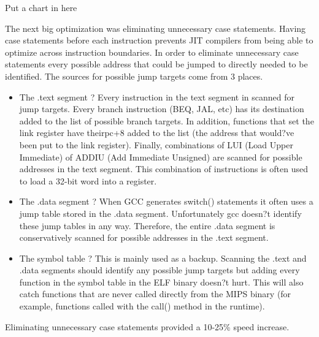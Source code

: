 \documentclass{acmconf}
\begin{document}
Put a chart in here

The next big optimization was eliminating unnecessary case
statements. Having case statements before each instruction prevents
JIT compilers from being able to optimize across instruction
boundaries. In order to eliminate unnecessary case statements every
possible address that could be jumped to directly needed to be
identified. The sources for possible jump targets come from 3 places.

\begin{itemize}

\item The .text segment ? Every instruction in the text segment in
      scanned for jump targets. Every branch instruction (BEQ, JAL,
      etc) has its destination added to the list of possible branch
      targets. In addition, functions that set the link register have
      theirpc+8 added to the list (the address that would?ve been put
      to the link register). Finally, combinations of LUI (Load Upper
      Immediate) of ADDIU (Add Immediate Unsigned) are scanned for
      possible addresses in the text segment. This combination of
      instructions is often used to load a 32-bit word into a
      register.

\item The .data segment ? When GCC generates switch() statements it
      often uses a jump table stored in the .data
      segment. Unfortunately gcc doesn?t identify these jump tables in
      any way. Therefore, the entire .data segment is conservatively
      scanned for possible addresses in the .text segment.
      
\item The symbol table ? This is mainly used as a backup. Scanning the
      .text and .data segments should identify any possible jump
      targets but adding every function in the symbol table in the ELF
      binary doesn?t hurt. This will also catch functions that are
      never called directly from the MIPS binary (for example,
      functions called with the call() method in the runtime).

\end{itemize}

Eliminating unnecessary case statements provided a 10-25\% speed
increase.
\end{document}
